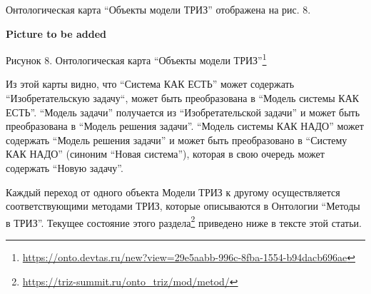 \documentclass[11pt,a4paper]{article}
\newcommand{\addpicture}{\textbf{Picture to be added}\par}
\begin{document}
Онтологическая карта “Объекты модели ТРИЗ” отображена на рис. 8.

\begin{center}
  \addpicture
  Рисунок 8. Онтологическая карта “Объекты модели
  ТРИЗ”\footnote{\url{https://onto.devtas.ru/new?view=29e5aabb-996c-8fba-1554-b94dacb696ae}} 
\end{center}
Из этой карты видно, что “Система КАК ЕСТЬ” может содержать “Изобретательскую
задачу“, может быть преобразована в “Модель системы КАК ЕСТЬ”. “Модель задачи”
получается из “Изобретательской задачи” и может быть преобразована в “Модель
решения задачи”. “Модель системы КАК НАДО” может содержать “Модель решения
задачи” и может быть преобразовано в “Систему КАК НАДО” (синоним “Новая
система”), которая в свою очередь может содержать “Новую задачу”.

Каждый переход от одного объекта Модели ТРИЗ к другому осуществляется
соответствующими методами ТРИЗ, которые описываются в Онтологии “Методы в
ТРИЗ”. Текущее состояние этого
раздела\footnote{\url{https://triz-summit.ru/onto_triz/mod/metod/}} приведено
ниже в тексте этой статьи.
\end{document}
